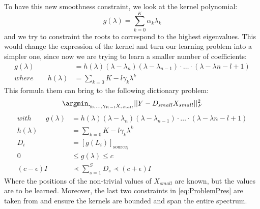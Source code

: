 To have this new smoothness constraint, we look at the kernel polynomial:
\begin{equation}
g(\lambda) = \sum_{k=0}^{K}\alpha_k \lambda_k
\end{equation}
and we try to constraint the roots to correspond to the highest eigenvalues. This would change the expression of the kernel and turn our learning problem into a simpler one, since now we are trying to learn a smaller number of coefficients:
\begin{align}
g(\lambda) &= h(\lambda)(\lambda - \lambda_n)(\lambda - \lambda_{n-1})\cdot \dots \cdot (\lambda - \lambda{n-l+1})\\
where \qquad h(\lambda) &= \sum_{k=0}{K-l}\gamma_k\lambda^{k}
\end{align}
This formula them can bring to the following dictionary problem:
\begin{equation}
\argmin_{\gamma_0,\dots,\gamma_{K-l}X_{small}} ||Y - D_{small}X_{small}||^2_F
\end{equation}
\begin{align}
with \qquad g(\lambda) &= h(\lambda)(\lambda - \lambda_n)(\lambda - \lambda_{n-1})\cdot \dots \cdot (\lambda - \lambda{n-l+1})\\
h(\lambda) &= \sum_{k=0}{K-l}\gamma_k\lambda^{k}\\
D_i &= [g(L_i)]_{\text{source}_i}\\
0 &\leq g(\lambda) \leq c\\
(c-\epsilon)I &\prec \sum_{s=1}^{S}D_s \prec (c+\epsilon)I
\end{align}
 Where the positions of the non-trivial values of $X_{small}$ are known, but the values are to be learned. Moreover, the last two constraints in \ref{eq:ProblemPres} are taken from \cite{Thanou2014} and ensure the kernels are bounded and span the entire spectrum.
